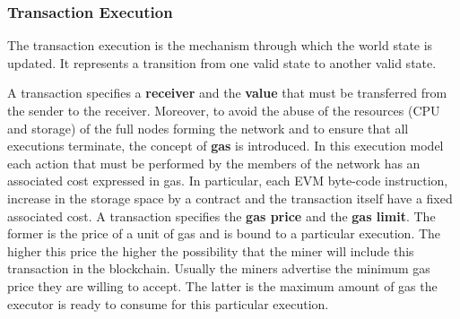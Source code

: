 \subsubsection{Transaction Execution}
\label{sec:tx-execution}

The transaction execution is the mechanism through which the world state is
updated. It represents a transition from one valid state to another valid state.

A transaction specifies a \textbf{receiver} and the \textbf{value} that must be
transferred from the sender to the receiver. Moreover, to avoid the abuse of the
resources (CPU and storage) of the full nodes forming the network and to ensure
that all executions terminate, the concept of \textbf{gas} is introduced. In
this execution model each action that must be performed by the members of the
network has an associated cost expressed in gas. In particular, each EVM
byte-code instruction, increase in the storage space by a contract and the
transaction itself have a fixed associated cost. A transaction specifies the
\textbf{gas price} and the \textbf{gas limit}. The former is the price of a unit
of gas and is bound to a particular execution. The higher this price the higher
the possibility that the miner will include this transaction in the blockchain.
Usually the miners advertise the minimum gas price they are willing to accept.
The latter is the maximum amount of gas the executor is ready to consume for
this particular execution.


